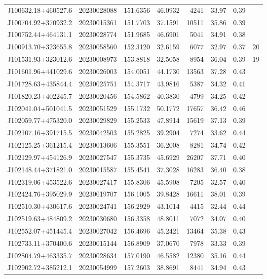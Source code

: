 \documentclass{article}
\begin{document}
\begin {longtable}{|l|l|r|r|r|r|r|l|}
 J100632.18+460527.6&  20230028088&  151.6356&   46.0932&  4241& 33.97& 0.39&\\
 J100704.92+370932.2&  20230015361&  151.7703&   37.1591& 10511& 35.86& 0.39&\\
 J100752.44+464131.1&  20230028774&  151.9685&   46.6901&  5041& 34.91& 0.38&\\
 J100913.70+323655.8&  20230058560&  152.3120&   32.6159&  6077& 32.97& 0.37&20\\
 J101531.93+323012.6&  20230008973&  153.8818&   32.5058&  8954& 36.04& 0.39&19\\
 J101601.96+441029.6&  20230026003&  154.0051&   44.1730& 13563& 37.28& 0.43&\\
 J101728.63+435844.4&  20230025751&  154.3717&   43.9816&  5387& 34.32& 0.41&\\
 J101820.23+402245.7&  20230020456&  154.5862&   40.3830&  4799& 34.25& 0.42&\\
 J102041.04+501041.5&  20230051529&  155.1732&   50.1772& 17657& 36.42& 0.46&\\
 J102059.77+475320.0&  20230029829&  155.2533&   47.8914& 15619& 37.13& 0.39&\\
 J102107.16+391715.5&  20230042503&  155.2825&   39.2904&  7274& 33.62& 0.44&\\
 J102125.25+361215.4&  20230013606&  155.3551&   36.2008&  8281& 34.74& 0.42&\\
 J102129.97+454126.9&  20230027547&  155.3735&   45.6929& 26207& 37.71& 0.40&\\
 J102148.44+371821.0&  20230015587&  155.4541&   37.3028& 16283& 36.40& 0.38&\\
 J102319.06+453522.6&  20230027417&  155.8306&   45.5908&  7205& 32.57& 0.40&\\
 J102424.76+395029.9&  20230019707&  156.1005&   39.8428& 16611& 38.01& 0.39&\\
 J102510.30+430617.6&  20230024741&  156.2929&   43.1014&  4415& 32.44& 0.44&\\
 J102519.63+484809.2&  20230030680&  156.3358&   48.8011&  7072& 34.07& 0.40&\\
 J102552.07+451445.4&  20230027042&  156.4696&   45.2421& 13464& 35.38& 0.43&\\
 J102733.11+370400.6&  20230015144&  156.8909&   37.0670&  7978& 33.33& 0.39&\\
 J102804.79+463335.7&  20230028634&  157.0190&   46.5582& 12380& 35.16& 0.44&\\
 J102902.72+385212.1&  20230054999&  157.2603&   38.8691&  8441& 34.94& 0.43&\\

\end{longtable}
\end{document}
